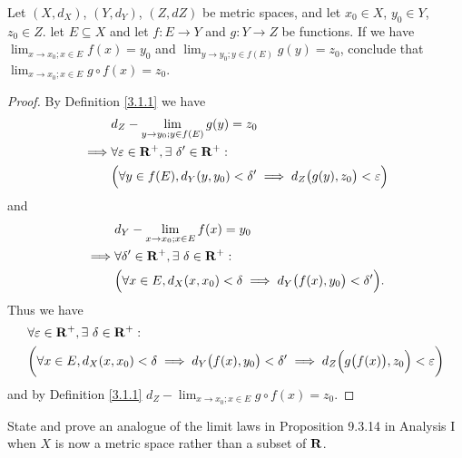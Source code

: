 \begin{exercise}\label{ex 3.1.5}
    Let \((X, d_X)\), \((Y, d_Y)\), \((Z, d Z)\) be metric spaces, and let \(x_0 \in X\), \(y_0 \in Y\), \(z_0 \in Z\).
    let \(E \subseteq X\) and let \(f : E \to Y\) and \(g : Y \to Z\) be functions.
    If we have \(\lim_{x \to x_0 ; x \in E} f(x) = y_0\) and \(\lim_{y \to y_0 ; y \in f(E)} g(y) = z_0\), conclude that \(\lim_{x \to x_0 ; x \in E} g \circ f(x) = z_0\).
\end{exercise}

\begin{proof}
    By Definition \ref{3.1.1} we have
    \begin{align*}
                 & d_Z - \lim_{y \to y_0 ; y \in f(E)} g(y) = z_0                                                    \\
        \implies & \forall \varepsilon \in \mathbf{R}^+, \exists\ \delta' \in \mathbf{R}^+ :                                         \\
                 & \Big(\forall y \in f(E), d_Y(y, y_0) < \delta' \implies d_Z\big(g(y), z_0\big) < \varepsilon\Big)
    \end{align*}
    and
    \begin{align*}
                 & d_Y - \lim_{x \to x_0 ; x \in E} f(x) = y_0                                                \\
        \implies & \forall \delta' \in \mathbf{R}^+, \exists\ \delta \in \mathbf{R}^+ :                                       \\
                 & \Big(\forall x \in E, d_X(x, x_0) < \delta \implies d_Y\big(f(x), y_0\big) < \delta'\Big).
    \end{align*}
    Thus we have
    \begin{align*}
         & \forall \varepsilon \in \mathbf{R}^+, \exists\ \delta \in \mathbf{R}^+ :                                                                                             \\
         & \bigg(\forall x \in E, d_X(x, x_0) < \delta \implies d_Y\big(f(x), y_0\big) < \delta' \implies d_Z\Big(g\big(f(x)\big), z_0\Big) < \varepsilon\bigg)
    \end{align*}
    and by Definition \ref{3.1.1} \(d_Z - \lim_{x \to x_0 ; x \in E} g \circ f(x) = z_0\).
\end{proof}

\begin{exercise}\label{ex 3.1.6}
    State and prove an analogue of the limit laws in Proposition 9.3.14 in Analysis I when \(X\) is now a metric space rather than a subset of \(\mathbf{R}\).
\end{exercise}

